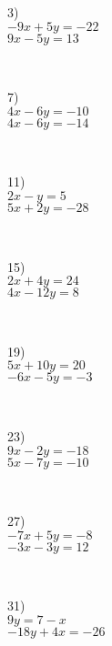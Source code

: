 \begin{multicols}{4}
  3)\\
  $- 9 x + 5 y = - 22$\\
  $9 x - 5 y = 13$\par
  ~\par
  7)\\
  $4 x - 6 y = - 10$\\
  $4 x - 6 y = - 14$\par
  ~\par
  11)\\
  $2 x - y = 5$\\
  $5 x + 2 y = - 28$\par
  ~\par
  15)\\
  $2 x + 4 y = 24$\\
  $4 x - 12 y = 8$\par
  ~\par
  19)\\
  $5 x + 10 y = 20$\\
  $- 6 x - 5 y = - 3$\par
  ~\par
  23)\\
  $9 x - 2 y = - 18$\\
  $5 x - 7 y = - 10$\par
  ~\par
  27)\\
  $- 7 x + 5 y = - 8$\\
  $- 3 x - 3 y = 12$\par
  ~\par
  31)\\
  $9 y = 7 - x$\\
  $- 18 y + 4 x = - 26$\par
	~\par
	~\par
	~\par
	~\par
	~\par


\end{multicols}
